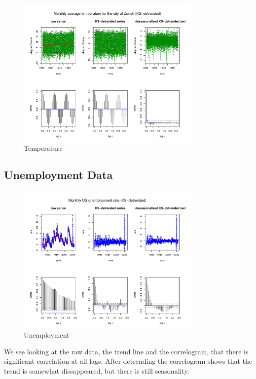\begin{figure}[H]
\centering
\includegraphics[width=0.8\textwidth]{plots/ZHP4.pdf}
\caption{Temperature}
\end{figure}

\subsection{Unemployment Data}


\begin{figure}[H]
\centering
\includegraphics[width=0.8\textwidth]{plots/UEMP.pdf}
\caption{Unemployment}
\end{figure}

We see looking at the raw data, the trend line and the correlogram, that there is significant correlation at all lags. After detrending the correlogram shows that the trend is somewhat dissappeared, but there is still seasonality.

